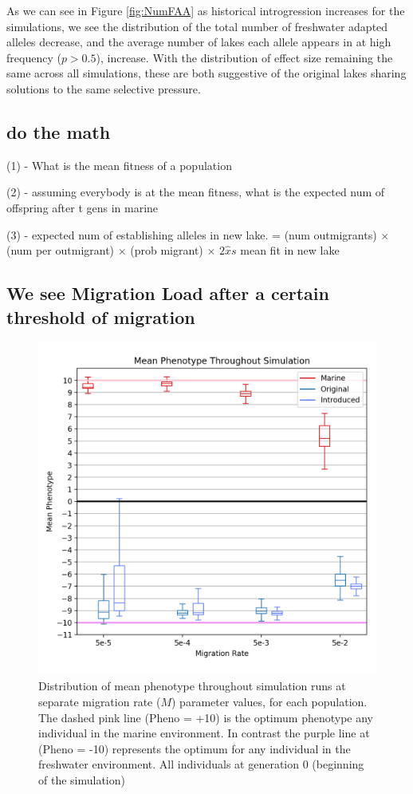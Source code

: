 \documentclass{article}
\newcommand{\jgg}[1]{\todo[linecolor=green,backgroundcolor=green!25,bordercolor=black]{#1}}
\begin{document}
As we can see in Figure \ref{fig:NumFAA}
as historical introgression increases for the simulations, 
we see the distribution of the total number of freshwater adapted alleles decrease, and 
the average number of lakes each allele appears in at high frequency ($p > 0.5$), increase.
With the distribution of effect size remaining the same across all simulations, 
these are both suggestive of the original lakes sharing solutions to the same selective pressure.



\subsection*{do the math}
\jgg{peter? :)}

(1) - What is the mean fitness of a population 

(2) - assuming everybody is at the mean fitness, what is the expected num of offspring after t gens in marine

(3) - expected num of establishing alleles in new lake. = (num outmigrants) $\times$ (num per outmigrant) $\times$ (prob migrant) $\times$ $2\hat{x}s $ mean fit in new lake

\subsection*{We see Migration Load after a certain threshold of migration}

\begin{figure}[h!tb]
	\begin{center}
  		\includegraphics[width=0.6\linewidth]{matplotlibPlots/MeanPhenotype1.png}
  		\caption{Distribution of mean phenotype throughout simulation runs at separate migration rate ($M$) parameter values, for each population.
		The dashed pink line (Pheno = +10) is the optimum phenotype any individual in the marine environment.
		In contrast the purple line at (Pheno = -10) represents the optimum for any individual in the freshwater environment. 
		All individuals at generation 0 (beginning of the simulation) 
		}
  		\label{fig:MeanPhenotype}
	\end{center}
\end{figure}
\end{document}
